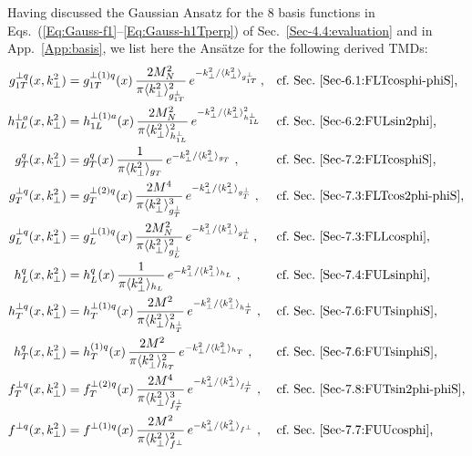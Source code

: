 \documentclass[a4paper,11pt]{article}
\newcommand{\la}{\langle}
\newcommand{\ra}{\rangle}
\def\kperp{k_\perp}
\def\avkperp{\la \kperp^2 \ra}
\begin{document}
Having discussed the Gaussian Ansatz for the 8 basis functions
in Eqs.~(\ref{Eq:Gauss-f1}--\ref{Eq:Gauss-h1Tperp}) of
Sec.~\ref{Sec-4.4:evaluation} and in App.~\ref{App:basis},
we list here the Ans\"atze for the following derived TMDs:
\begin{subequations}\begin{align}
	g_{1T}^{\perp q}(x,\kperp^2) 
	  &=	g_{1T}^{\perp (1) q}(x)\,
		\frac{2 M_N^2}{\pi \avkperp_{g_{1T}^\perp}^2}\,
		e^{-\kperp^2/{\avkperp_{g_{1T}^\perp}}}  \,, 
	  && 	\mbox{cf.\ Sec.~\ref{Sec-6.1:FLTcosphi-phiS},}
		\label{eq:g1t}\\
	h_{1L}^{\perp a}(x,\kperp^2) 
	  &= 	h_{1L}^{\perp (1) a}(x)\,
		\frac{2 M_N^2}{\pi{\avkperp_{h_{1L}^\perp}^2}}\,
		e^{-\kperp^2/{\avkperp_{h_{1L}^\perp}^2}}
	  && 	\mbox{cf.\ Sec.~\ref{Sec-6.2:FULsin2phi},}	
		\label{eq:h1l_final}\\
	g^{q}_{T}(x,\kperp^2) 
	  &=	g^{q}_{T}(x)\,\frac{1}{\pi \avkperp_{g_{T}}}\,
		e^{-\kperp^2/{\avkperp_{g_{T}}}}\;,
	  && 	\mbox{cf.\ Sec.~\ref{Sec-7.2:FLTcosphiS},}	
		\label{eq:gtnew} \\
	g^{\perp q}_{T}(x,\kperp^2) 
	  &= 	g^{\perp (2) q}_{T}(x)\,\frac{2 M^4}{\pi \avkperp^3_{g_{T}^{\perp} }}\,
		e^{-\kperp^2/{\avkperp_{g_{T}^{\perp} }}}\;,
	  && 	\mbox{cf.\ Sec.~\ref{Sec-7.3:FLTcos2phi-phiS},}	
		\label{eq:gtperpnew} \\
	g_{L}^{\perp q}(x,\kperp^2) 
	  &=	g_{L}^{\perp (1) q}(x)\,
		\frac{2 M_N^2}{\pi \avkperp_{g_{L}^\perp}^2}\,
		e^{-\kperp^2/{\avkperp_{g_{L}^\perp}}}  \,, 
	  && 	\mbox{cf.\ Sec.~\ref{Sec-7.3:FLLcosphi},}
		\label{eq:gLperp} \\
	h_L^q(x,\kperp^2) 
	  &= 	h_L^q(x) \,\frac{1}{\pi \avkperp_{h_{L}}}\,
		e^{-\kperp^2/{\avkperp_{h_{L}}}}\;,
	  && 	\mbox{cf.\ Sec.~\ref{Sec-7.4:FULsinphi},}
		\label{eq:hLnew}\\
	h_T^{\perp q}(x,\kperp^2) 
	  &=	h_T^{\perp (1) q}(x)\,\frac{2 M^2}{\pi \avkperp_{h_{T}^\perp}^2}\,
	  	e^{-\kperp^2/{\avkperp_{h_{T}^\perp}}}\;,
	  && 	\mbox{cf.\ Sec.~\ref{Sec-7.6:FUTsinphiS},}
		\label{eq:hTperpnew}\\
	h_T^{q}(x,\kperp^2) 
	  &=	h_T^{(1) q}(x) \,\frac{2 M^2}{\pi \avkperp_{h_{T}}^2}\,
		e^{-\kperp^2/{\avkperp_{h_{T}}}}\;,
	  && 	\mbox{cf.\ Sec.~\ref{Sec-7.6:FUTsinphiS},}
		\label{eq:hTnew}\\
	f^{\perp q}_{T}(x,\kperp^2) 
	  &= 	f^{\perp (2) q}_{T}(x)\,\frac{2 M^4}{\pi \avkperp^3_{f_{T}^{\perp} }}\,
		e^{-\kperp^2/{\avkperp_{f_{T}^{\perp} }}}\;,
	  && 	\mbox{cf.\ Sec.~\ref{Sec-7.8:FUTsin2phi-phiS},}
		\label{eq:ftperpnew}\\
	f^{\perp q}(x,\kperp^2) 
	  &= 	f^{\perp (1) q}(x) \,\frac{2 M^2}{\pi \avkperp_{f^\perp}^2}\,
		e^{-\kperp^2/{\avkperp_{f^\perp}}}\;,
	  && 	\mbox{cf.\ Sec.~\ref{Sec-7.7:FUUcosphi},}
		\label{eq:fperpnew}
\end{align}\end{subequations}
\end{document}
